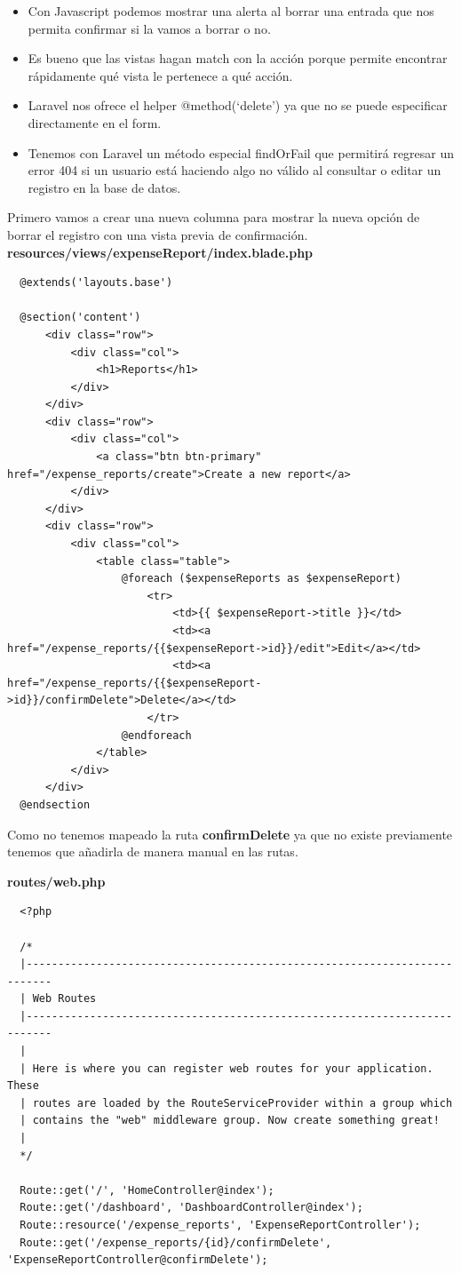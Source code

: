 \documentclass{article}
\begin{document}
\begin{itemize}
  \item Con Javascript podemos mostrar una alerta al borrar una entrada que nos
    permita confirmar si la vamos a borrar o no.
  \item Es bueno que las vistas hagan match con la acción porque permite
    encontrar rápidamente qué vista le pertenece a qué acción.
  \item Laravel nos ofrece el helper @method(‘delete’) ya que no se puede
    especificar directamente en el form.
  \item Tenemos con Laravel un método especial findOrFail que permitirá
    regresar un error 404 si un usuario está haciendo algo no válido al
    consultar o editar un registro en la base de datos.
\end{itemize}

Primero vamos a crear una nueva columna para mostrar la nueva opción de borrar
el registro con una vista previa de confirmación.\\

\textbf{resources/views/expenseReport/index.blade.php}
\begin{verbatim}
  @extends('layouts.base')

  @section('content')
      <div class="row">
          <div class="col">
              <h1>Reports</h1>
          </div>
      </div>
      <div class="row">
          <div class="col">
              <a class="btn btn-primary" href="/expense_reports/create">Create a new report</a>
          </div>
      </div>
      <div class="row">
          <div class="col">
              <table class="table">
                  @foreach ($expenseReports as $expenseReport)
                      <tr>
                          <td>{{ $expenseReport->title }}</td>
                          <td><a href="/expense_reports/{{$expenseReport->id}}/edit">Edit</a></td>
                          <td><a href="/expense_reports/{{$expenseReport->id}}/confirmDelete">Delete</a></td>
                      </tr>
                  @endforeach
              </table>
          </div>
      </div>
  @endsection
\end{verbatim}

Como no tenemos mapeado la ruta \textbf{confirmDelete} ya que no existe
previamente tenemos que añadirla de manera manual en las rutas.

\textbf{routes/web.php}
\begin{verbatim}
  <?php

  /*
  |--------------------------------------------------------------------------
  | Web Routes
  |--------------------------------------------------------------------------
  |
  | Here is where you can register web routes for your application. These
  | routes are loaded by the RouteServiceProvider within a group which
  | contains the "web" middleware group. Now create something great!
  |
  */

  Route::get('/', 'HomeController@index');
  Route::get('/dashboard', 'DashboardController@index');
  Route::resource('/expense_reports', 'ExpenseReportController');
  Route::get('/expense_reports/{id}/confirmDelete', 'ExpenseReportController@confirmDelete');
\end{verbatim}
\end{document}
